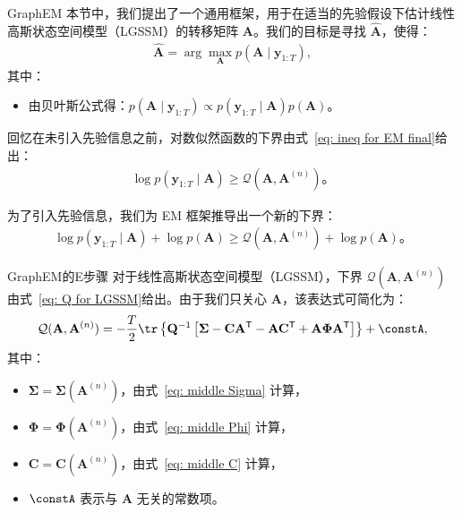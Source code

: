 \documentclass[presentation,aspectratio=169]{ctexbeamer}
\begin{document}
\begin{frame}{GraphEM}
本节中，我们提出了一个通用框架，用于在适当的先验假设下估计线性高斯状态空间模型（LGSSM）的转移矩阵 \(\mathbf{A}\)。我们的目标是寻找 \(\widehat{\mathbf{A}}\)，使得：
\begin{align}
    \widehat{\mathbf{A}} = \arg \max_{\mathbf{A}} p(\mathbf{A} \mid \mathbf{y}_{1:T}), \label{eq: GraphEM argmax}
\end{align}
其中：
\begin{itemize}
    \item 由贝叶斯公式得：\(p(\mathbf{A} \mid \mathbf{y}_{1:T}) \propto p(\mathbf{y}_{1:T} \mid \mathbf{A}) p(\mathbf{A})\)。
\end{itemize}
\pause

回忆在未引入先验信息之前，对数似然函数的下界由式~\eqref{eq: ineq for EM final}给出：
\begin{align}
    \log p(\mathbf{y}_{1:T} \mid \mathbf{A}) \ge \mathcal{Q}(\mathbf{A}, \mathbf{A}^{(n)})。
\end{align}
\pause

为了引入先验信息，我们为 EM 框架推导出一个新的下界：
\begin{align}
    \log p(\mathbf{y}_{1:T} \mid \mathbf{A}) + \log p(\mathbf{A}) \ge \mathcal{Q}(\mathbf{A}, \mathbf{A}^{(n)}) + \log p(\mathbf{A})。 \label{eq: ineq for GraphEM}
\end{align}
\end{frame}

\begin{frame}{GraphEM的E步骤}
对于线性高斯状态空间模型（LGSSM），下界 \(\mathcal{Q}(\mathbf{A}, \mathbf{A}^{(n)})\) 由式~\eqref{eq: Q for LGSSM}给出。由于我们只关心 \(\mathbf{A}\)，该表达式可简化为：
\begin{align}
    \mathcal{Q}(\mathbf{A}, \mathbf{A}^{(n)}) = - \frac{T}{2} \tr \left\{ \mathbf{Q}^{-1} \left[ \boldsymbol{\Sigma} - \mathbf{C} \mathbf{A}^{\mathsf{T}} - \mathbf{A} \mathbf{C}^{\mathsf{T}} + \mathbf{A} \boldsymbol{\Phi} \mathbf{A}^{\mathsf{T}} \right] \right\} + \constA,
\end{align}
其中：
\begin{itemize}
    \item \(\boldsymbol{\Sigma} = \boldsymbol{\Sigma}(\mathbf{A}^{(n)})\)，由式~\eqref{eq: middle Sigma} 计算，
    \item \(\boldsymbol{\Phi} = \boldsymbol{\Phi}(\mathbf{A}^{(n)})\)，由式~\eqref{eq: middle Phi} 计算，
    \item \(\mathbf{C} = \mathbf{C}(\mathbf{A}^{(n)})\)，由式~\eqref{eq: middle C} 计算，
    \item \(\constA\) 表示与 \(\mathbf{A}\) 无关的常数项。
\end{itemize}
\end{frame}
\end{document}
